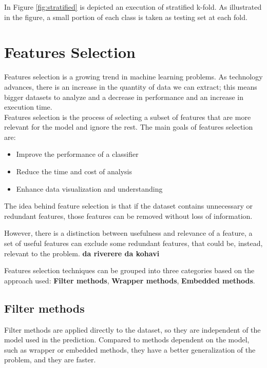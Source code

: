 In Figure \ref{fig:stratified} is depicted an execution of stratified k-fold. As illustrated in the figure, a small portion of each class is taken as testing set at each fold.





\section{Features Selection}

Features selection is a growing trend in machine learning problems. As technology advances, there is an increase in the quantity of data we can extract; this means bigger datasets to analyze and a decrease in performance and an increase in execution time. \\

Features selection is the process of selecting a subset of features that are more relevant for the model and ignore the rest.
The main goals of features selection are: \cite{guyon2003introduction}
\begin{itemize}
	\item Improve the performance of a classifier
	\item Reduce the time and cost of analysis
	\item Enhance data visualization and understanding
\end{itemize}

The idea behind feature selection is that if the dataset contains unnecessary or redundant features, those features can be removed without loss of information. \cite{bermingham2015application}

However, there is a distinction between usefulness and relevance of a feature, a set of useful features can exclude some redundant features, that could be, instead, relevant to the problem.\cite{kohavi1997wrappers} \textbf{da riverere da kohavi}

Features selection techniques can be grouped into three categories based on the approach used: \textbf{Filter methods}, \textbf{Wrapper methods}, \textbf{Embedded methods}.

\subsection{Filter methods}
Filter methods are applied directly to the dataset, so they are independent of the model used in the prediction. Compared to methods dependent on the model, such as wrapper or embedded methods, they have a better generalization of the problem, and they are faster. \cite{kohavi1997wrappers}

